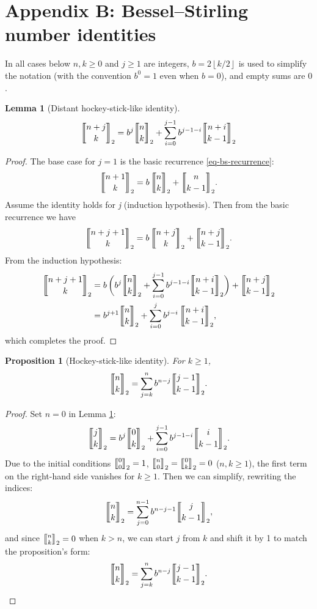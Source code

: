 \documentclass[a4paper]{amsart}
\numberwithin{equation}{section}
\newcommand{\mStirling}[0]{\genfrac{\llbracket}{\rrbracket}{0pt}{}}
\newcommand{\floor}[1]{\left\lfloor #1 \right\rfloor}
\newtheorem{proposition}[theorem]{Proposition}
\newtheorem{lemma}[theorem]{Lemma}
\begin{document}
\section*{Appendix B: Bessel--Stirling number identities}
\noindent In all cases below $n, k \geq 0$ and $j \geq 1$ are integers, $b = 2\floor{k/2}$ is used to simplify the notation (with the convention $b^0 = 1$ even when $b = 0$), and empty sums are $0$.
\begin{lemma}[Distant hockey-stick-like identity]\label{lemma-dist-hockey}
\[
    \mStirling{n+j}{k}_2 = b^j \mStirling{n}{k}_2 +\sum_{i=0}^{j-1}b^{j-1-i}\mStirling{n+i}{k-1}_2
\]
\end{lemma}
\begin{proof}
The base case for $j=1$ is the basic recurrence \eqref{eq-bs-recurrence}:
\[
    \mStirling{n+1}{k}_2 = b \,\mStirling{n}{k}_2 + \mStirling{n}{k-1}_2.
\]
Assume the identity holds for \textit{j} (induction hypothesis). Then from the basic recurrence we have
\[
    \mStirling{n+j+1}{k}_2 = b \, \mStirling{n+j}{k}_2 +\mStirling{n+j}{k-1}_2.
\]
From the induction hypothesis:
\[
    \begin{aligned}
        \mStirling{n+j+1}{k}_2 &= b \, \bigg(b^j \mStirling{n}{k}_2 +\sum_{i=0}^{j-1}b^{j-1-i}\mStirling{n+i}{k-1}_2\bigg) +\mStirling{n+j}{k-1}_2 \\
                   &= b^{j+1}\mStirling{n}{k}_2+\sum_{i=0}^jb^{j-i}\, \mStirling{n+i}{k-1}_2,
    \end{aligned}
\]
which completes the proof.
\end{proof}
\begin{proposition}[Hockey-stick-like identity]
For $k \geq 1$,
    \[
        \mStirling{n}{k}_2 = \sum_{j=k}^{n}b^{n-j} \mStirling{j-1}{k-1}_2.
    \]
\end{proposition}
\begin{proof}
Set $n=0$ in Lemma \ref{lemma-dist-hockey}:
\[
    \mStirling{j}{k}_2 = b^j \mStirling{0}{k}_2 +\sum_{i=0}^{j-1}b^{j-1-i}\mStirling{i}{k-1}_2.
\]
Due to the initial conditions $\mStirling{0}{0}_2=1$, $\mStirling{n}{0}_2 = \mStirling{0}{k}_2 =0$ ($n, k \geq 1$), the first term on the right-hand side vanishes for $k \geq 1$. Then we can simplify, rewriting the indices:
\[
\mStirling{n}{k}_2 = \sum_{j=0}^{n-1}b^{n-j-1}\mStirling{j}{k-1}_2,
\]
and since $\mStirling{n}{k}_2 =0$ when $k > n$, we can start $j$ from $k$ and shift it by 1 to match the proposition's form:
\[
        \mStirling{n}{k}_2 = \sum_{j=k}^{n}b^{n-j} \mStirling{j-1}{k-1}_2. \qedhere
\]
\end{proof}
\end{document}

